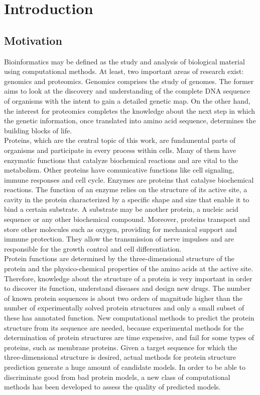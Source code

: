 

\chapter{Introduction}
\label{chap:introduction}

\section{Motivation}
\label{sec:motivation}
Bioinformatics may be defined as the study and analysis of biological material using computational methods. At least, two important areas of research exist: genomics and proteomics. Genomics comprises the study of genomes. The former aims to look at the discovery and understanding of the complete DNA sequence of organisms with the intent to gain a detailed genetic map. On the other hand, the interest for proteomics completes the knowledge about the next step in which the genetic information, once translated into amino acid sequence, determines the building blocks of life.\\
Proteins, which are the central topic of this work, are fundamental parts of organisms and participate in every process within cells. Many of them have enzymatic functions that catalyze biochemical reactions and are vital to the metabolism. Other proteins have comunicative functions like cell signaling, immune responses and cell cycle. Enzymes are proteins that catalyse biochemical reactions. The function of an enzyme relies on the structure of its active site, a cavity in the protein characterized by a specific shape and size that enable it to bind a certain substrate. A substrate may be another protein, a nucleic acid sequence or any other biochemical compound. Moreover, proteins transport and store other molecules such as oxygen, providing for mechanical support and immune protection. They allow the transmission of nerve impulses and are responsible for the growth control and cell differentiation. \\
Protein functions are determined by the three-\-di\-men\-sio\-nal structure of the protein and the physico-chemical properties of the amino acids at the active site. Therefore, knowledge about the structure of a protein is very important in order to discover its function, understand diseases and design new drugs. The number of known protein sequences is about two orders of magnitude higher than the number of experimentally solved protein structures and only a small subset of these has annotated function. New computational methods to predict the protein structure from its sequence are needed, because experimental methods for the determination of protein structures are time expensive, and fail for some types of proteins, such as membrane proteins. Given a target sequence for which the three-\-di\-men\-sio\-nal structure is desired, actual methods for protein structure prediction generate a huge amount of candidate models. In order to be able to discriminate good from bad protein models, a new class of computational methods has been developed to assess the quality of predicted models.


